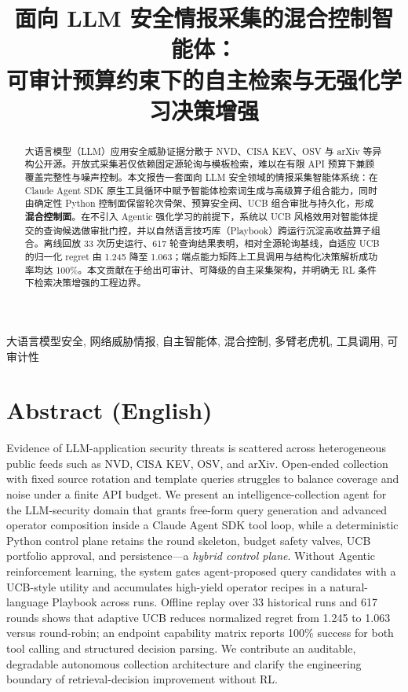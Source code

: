 \documentclass[conference]{IEEEtran}
\begin{document}
\title{面向 LLM 安全情报采集的混合控制智能体：\\可审计预算约束下的自主检索与无强化学习决策增强}

\author{
}

\maketitle

\begin{abstract}
大语言模型（LLM）应用安全威胁证据分散于 NVD、CISA KEV、OSV 与 arXiv 等异构公开源。开放式采集若仅依赖固定源轮询与模板检索，难以在有限 API 预算下兼顾覆盖完整性与噪声控制。本文报告一套面向 LLM 安全领域的情报采集智能体系统：在 Claude Agent SDK 原生工具循环中赋予智能体检索词生成与高级算子组合能力，同时由确定性 Python 控制面保留轮次骨架、预算安全阀、UCB 组合审批与持久化，形成\textbf{混合控制面}。在不引入 Agentic 强化学习的前提下，系统以 UCB 风格效用对智能体提交的查询候选做审批门控，并以自然语言技巧库（Playbook）跨运行沉淀高收益算子组合。离线回放 33 次历史运行、617 轮查询结果表明，相对全源轮询基线，自适应 UCB 的归一化 regret 由 1.245 降至 1.063；端点能力矩阵上工具调用与结构化决策解析成功率均达 100\%。本文贡献在于给出可审计、可降级的自主采集架构，并明确无 RL 条件下检索决策增强的工程边界。
\end{abstract}

\begin{IEEEkeywords}
大语言模型安全, 网络威胁情报, 自主智能体, 混合控制, 多臂老虎机, 工具调用, 可审计性
\end{IEEEkeywords}

\section*{Abstract (English)}
Evidence of LLM-application security threats is scattered across heterogeneous public feeds such as NVD, CISA KEV, OSV, and arXiv. Open-ended collection with fixed source rotation and template queries struggles to balance coverage and noise under a finite API budget. We present an intelligence-collection agent for the LLM-security domain that grants free-form query generation and advanced operator composition inside a Claude Agent SDK tool loop, while a deterministic Python control plane retains the round skeleton, budget safety valves, UCB portfolio approval, and persistence---a \emph{hybrid control plane}. Without Agentic reinforcement learning, the system gates agent-proposed query candidates with a UCB-style utility and accumulates high-yield operator recipes in a natural-language Playbook across runs. Offline replay over 33 historical runs and 617 rounds shows that adaptive UCB reduces normalized regret from 1.245 to 1.063 versus round-robin; an endpoint capability matrix reports 100\% success for both tool calling and structured decision parsing. We contribute an auditable, degradable autonomous collection architecture and clarify the engineering boundary of retrieval-decision improvement without RL.
\end{document}
